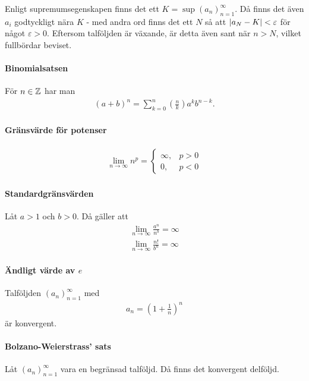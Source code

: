 \proof
Enligt supremumsegenskapen finns det ett $K = \sup{\left(a_n\right)_{n = 1}^\infty}$. Då finns det även $a_i$ godtyckligt nära $K$ - med andra ord finns det ett $N$ så att $\abs{a_N - K} < \varepsilon$ för något $\varepsilon > 0$. Eftersom talföljden är växande, är detta även sant när $n > N$, vilket fullbördar beviset.

\paragraph{Binomialsatsen}
För $n\in\mathbb{Z}$ har man
\begin{align*}
	(a + b)^n = \sum\limits_{k = 0}^{n}\left(\frac{n}{k}\right) a^kb^{n-k}.
\end{align*}

\proof

\paragraph{Gränsvärde för potenser}
\begin{align*}
	\lim_{n\to\infty} n^p =
	\begin{cases}
		\infty, & p > 0\\
		0,      & p < 0
	\end{cases}
\end{align*}

\proof

\paragraph{Standardgränsvärden}
Låt $a > 1$ och $b > 0$. Då gäller att
\begin{align*}
	\lim_{n\to\infty}\frac{a^n}{n^b} = \infty \\
	\lim_{n\to\infty}\frac{n!}{b^n} = \infty
\end{align*}

\proof

\paragraph{Ändligt värde av $e$}
Talföljden $\left(a_n\right)_{n = 1}^\infty$ med
\begin{align*}
	a_n = \left(1 + \frac{1}{n}\right)^{n}
\end{align*}
är konvergent.

\proof

\paragraph{Bolzano-Weierstrass' sats}
Låt $\left(a_n\right)_{n = 1}^\infty$ vara en begränsad talföljd. Då finns det konvergent delföljd.

\proof